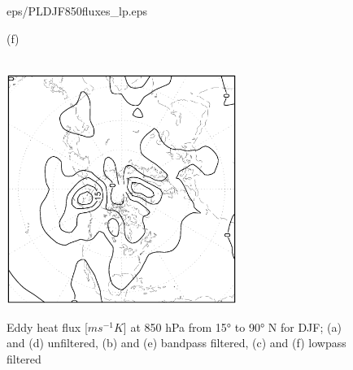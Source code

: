 \documentclass[12pt,a4paper,twoside,openright,headinclude,liststotoc,bibtotoc]{scrreprt}
\begin{document}
\begin{figure}[c]
{{eps/PLDJF850fluxes_lp.eps}
}
\parbox{8.5cm}{\hspace{0.95cm}\begin{scriptsize}(f)\end{scriptsize} \vspace{-0.2cm} \\
\includegraphics[height=7.5cm,angle=-90]
{eps/ERADJF850fluxes_lp.eps}
}
\caption[Eddy heat flux at 850 hPa for DJF and JJA]{Eddy heat flux [$ms^{-1}K$] at 850 hPa from 15° to 90° N for DJF; (a) and (d) unfiltered, (b) and (e) bandpass filtered, (c) and (f) lowpass filtered}
\label{img:vT850DJF}
\end{figure}
\end{document}
